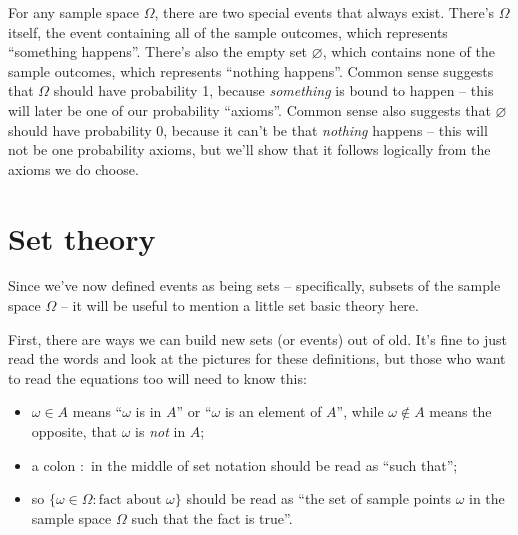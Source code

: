\documentclass[
  a4paper,
]{book}
\providecommand{\tightlist}{%
  \setlength{\itemsep}{0pt}\setlength{\parskip}{0pt}}
\theoremstyle{definition}
\theoremstyle{definition}
\theoremstyle{definition}
\theoremstyle{definition}
\theoremstyle{remark}
\begin{document}
For any sample space \(\Omega\), there are two special events that always exist. There's \(\Omega\) itself, the event containing all of the sample outcomes, which represents ``something happens''. There's also the empty set \(\varnothing\), which contains none of the sample outcomes, which represents ``nothing happens''. Common sense suggests that \(\Omega\) should have probability 1, because \emph{something} is bound to happen -- this will later be one of our probability ``axioms''. Common sense also suggests that \(\varnothing\) should have probability 0, because it can't be that \emph{nothing} happens -- this will not be one probability axioms, but we'll show that it follows logically from the axioms we do choose.

\hypertarget{set-theory}{%
\section{Set theory}\label{set-theory}}

Since we've now defined events as being sets -- specifically, subsets of the sample space \(\Omega\) -- it will be useful to mention a little set basic theory here.

First, there are ways we can build new sets (or events) out of old. It's fine to just read the words and look at the pictures for these definitions, but those who want to read the equations too will need to know this:

\begin{itemize}
\tightlist
\item
  \(\omega \in A\) means ``\(\omega\) is in \(A\)'' or ``\(\omega\) is an element of \(A\)'', while \(\omega \not\in A\) means the opposite, that \(\omega\) is \emph{not} in \(A\);
\item
  a colon \(:\) in the middle of set notation should be read as ``such that'';
\item
  so \(\{\omega \in \Omega : \text{fact about $\omega$}\}\) should be read as ``the set of sample points \(\omega\) in the sample space \(\Omega\) such that the fact is true''.
\end{itemize}
\end{document}
